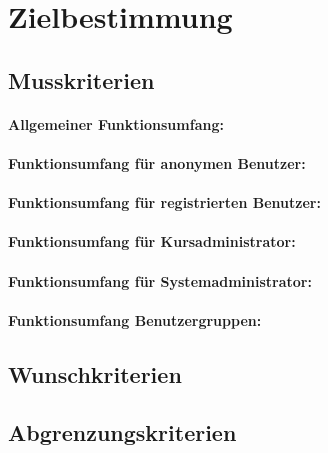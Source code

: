 \documentclass[a4paper]{scrreprt}
\begin{document}
 


\tableofcontents
 
\chapter{Zielbestimmung}
	   
    \section{Musskriterien}      
    	\subsubsection{Allgemeiner Funktionsumfang:}
      		
     	\subsubsection{Funktionsumfang für anonymen Benutzer:}
       	
     	\subsubsection{Funktionsumfang für registrierten Benutzer:}
		
		\subsubsection{Funktionsumfang für Kursadministrator:}
		
		\subsubsection{Funktionsumfang für Systemadministrator:}
		
		\subsubsection{Funktionsumfang Benutzergruppen:}
			
    \section{Wunschkriterien}
			
		\section{Abgrenzungskriterien}
     		
\end{document}
